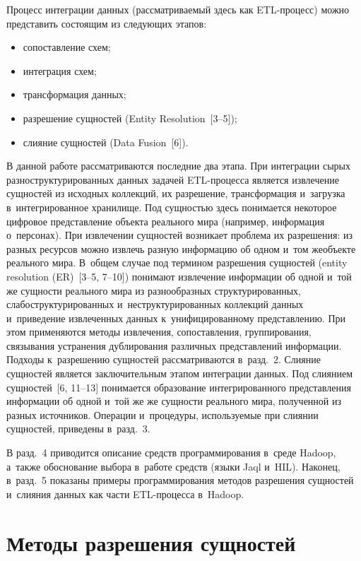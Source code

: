 \begin{multicols}{2}
  Процесс интеграции данных (рассматриваемый здесь как ETL-про\-цесс) можно
представить состоящим из следующих этапов:
  \begin{itemize}
\item сопоставление схем;
\item интеграция схем;
\item трансформация данных;
\item разрешение сущностей (Entity Resolution~[3--5]);
\item слияние сущностей (Data Fusion~[6]).
\end{itemize}

  В данной работе рассматриваются последние два этапа. При интеграции сырых
разноструктурированных данных задачей ETL-про\-цес\-са является извлечение сущностей
из исходных коллекций, их разрешение, трансформация и~загрузка в~интегрированное
хранилище. Под сущностью здесь понимается некоторое цифровое представление объекта\linebreak
реального мира (например, информация о~персонах). При извлечении сущностей возникает
проб\-ле\-ма их разрешения: из разных ресурсов можно извлечь разную информацию об одном
и~том же\linebreak объекте реального мира. В~общем случае под термином разрешения сущностей
(entity resolution (ER)~[3--5, 7--10]) понимают извлечение информации об одной и~той же
сущности реального мира из разнообразных структурированных, слабоструктурированных
и~неструктурированных коллекций данных и~приведение извлеченных данных
к~унифицированному представлению. При этом применяются методы извлечения,
сопоставления, группирования, связывания устранения дублирования различных
представлений информации. Подходы к~разрешению сущностей рассматриваются
в~разд.~2. Слияние сущностей является заключительным этапом интеграции
данных. Под слиянием сущностей~[6, 11--13] понимается образование интегрированного
представления информации об одной и~той же же сущности реального мира, полученной из разных
источников. Операции и~процедуры, ис\-поль\-зу\-емые при слиянии сущностей, приведены
в~разд.~3.

  В разд.~4 приводится описание средств программирования в~среде Hadoop,
а~также обоснование выбора в~работе средств (языки Jaql и~HIL). Наконец, в~разд.~5
показаны примеры программирования методов разрешения сущностей и~слияния данных
как части ETL-про\-цес\-са в~Hadoop.

\section{Методы разрешения сущностей}


\end{multicols}
